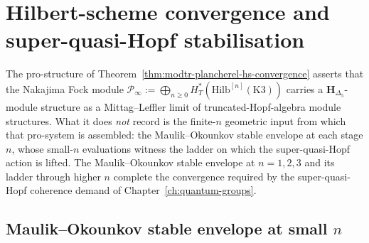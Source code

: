 \section{Hilbert-scheme convergence and super-quasi-Hopf stabilisation}
\label{sec:modtr-nekrasov-hs-convergence}

The pro-structure of
Theorem~\ref{thm:modtr-plancherel-hs-convergence} asserts that
the Nakajima Fock module
$\mathcal P_\infty := \bigoplus_{n\geq 0} H^*_T(\mathrm{Hilb}^{[n]}(\mathrm K3))$
carries a $\mathbf H_{\Delta_5}$-module structure as a Mittag--Leffler
limit of truncated-Hopf-algebra module structures. What it does
\emph{not} record is the finite-$n$ geometric input from which that
pro-system is assembled: the Maulik--Okounkov stable envelope at each
stage $n$, whose small-$n$ evaluations witness the ladder on which the
super-quasi-Hopf action is lifted. The Maulik--Okounkov stable
envelope at $n = 1, 2, 3$ and its ladder through higher $n$ complete
the convergence required by the super-quasi-Hopf coherence demand of
Chapter~\ref{ch:quantum-groups}.

\subsection{Maulik--Okounkov stable envelope at small \texorpdfstring{$n$}{n}}
\label{subsec:modtr-mo-small-n}

